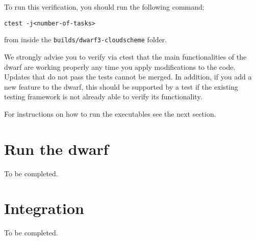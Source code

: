 \documentclass[
a4paper,     %
12pt,        %
article,
onecolumn,   %
openany,     %
]{memoir}
\newcommand{\inlsh}[1]{\texttt{#1}}
\newcommand{\inlsh}[1]{\tikz[anchor=base,baseline]\node[inner sep=2pt,
outer sep=0,draw=yellow!10,fill=yellow!10]{\texttt{#1}};}
\begin{document}
To run this verification, you should run the following 
command:
%
\begin{lstlisting}[style=BashStyle]
ctest -j<number-of-tasks>
\end{lstlisting}
%
from inside the \inlsh{builds/dwarf3-cloudscheme}
folder.
%
\begin{warningbox}
We strongly advise you to verify via ctest that 
the main functionalities of the dwarf are working 
properly any time you apply modifications to the 
code. Updates that do not pass the tests cannot 
be merged. 
In addition, if you add a new feature to the dwarf,
this should be supported by a test if the existing
testing framework is not already able to verify its
functionality.
\end{warningbox}
%
For instructions on how to run the executables 
see the next section.


\section{Run the dwarf}
To be completed.

 


\section{Integration}
To be completed.



\backmatter




\end{document}

